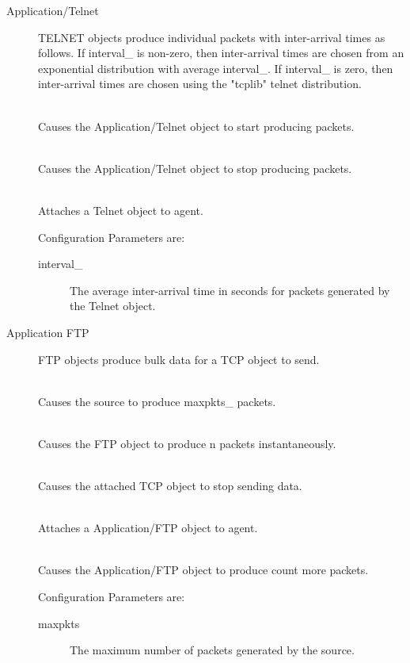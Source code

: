 \begin{description}
\item[Application/Telnet]
TELNET objects produce individual packets with inter-arrival times as
follows. If interval\_ is non-zero, then inter-arrival times are chosen
from an exponential distribution with average interval\_. If interval\_ is
zero, then inter-arrival times are chosen using the "tcplib" telnet
distribution. 

\\
Causes the Application/Telnet object to start producing packets. 

\\
Causes the Application/Telnet object to stop producing packets. 

\\
Attaches a Telnet object to agent. 

Configuration Parameters are:
\begin{description}

\item[interval\_]
The average inter-arrival time in seconds for packets generated by the
Telnet object. 
\end{description}


\item[Application FTP]
FTP objects produce bulk data for a TCP object to send. 

\\
Causes the source to produce maxpkts\_ packets. 

\\
Causes the FTP object to produce n packets instantaneously. 

\\
Causes the attached TCP object to stop sending data. 

\\
Attaches a Application/FTP object to agent. 

\\
Causes the Application/FTP object to produce count more packets. 

Configuration Parameters are:
\begin{description}
\item[maxpkts] The maximum number of packets generated by the source. 
\end{description}
\end{description}

